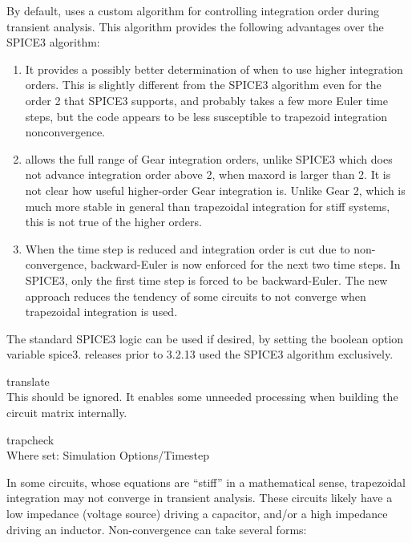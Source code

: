 \begin{description}
By default, {\WRspice} uses a custom algorithm for controlling
integration order during transient analysis.  This algorithm provides
the following advantages over the SPICE3 algorithm:

\begin{enumerate}
\item{It provides a possibly better determination of when to use 
higher integration orders.  This is slightly different from the
SPICE3 algorithm even for the order 2 that SPICE3 supports, and  
probably takes a few more Euler time steps, but the
{\WRspice} code appears to be less susceptible to trapezoid 
integration nonconvergence.}

\item{{\WRspice} allows the full range of Gear integration orders,
unlike SPICE3 which does not advance integration order above 2, when
{\et maxord} is larger than 2.  It is not clear how useful
higher-order Gear integration is.  Unlike Gear 2, which is much more
stable in general than trapezoidal integration for stiff systems, this
is not true of the higher orders.}

\item{When the time step is reduced and integration order is cut due
to non-convergence, backward-Euler is now enforced for the next two
time steps.  In SPICE3, only the first time step is forced to be
backward-Euler.  The new approach reduces the tendency of some
circuits to not converge when trapezoidal integration is used.}
\end{enumerate}

The standard SPICE3 logic can be used if desired, by setting the
boolean option variable {\et spice3}.  {\WRspice} releases prior to
3.2.13 used the SPICE3 algorithm exclusively.

\item{\et translate}\\
This should be ignored.  It enables some unneeded processing when
building the circuit matrix internally.

\item{\et trapcheck}\\
Where set: {\cb Simulation Options/Timestep}

In some circuits, whose equations are ``stiff'' in a mathematical
sense, trapezoidal integration may not converge in transient analysis. 
These circuits likely have a low impedance (voltage source) driving a
capacitor, and/or a high impedance driving an inductor. 
Non-convergence can take several forms:


\end{description}
